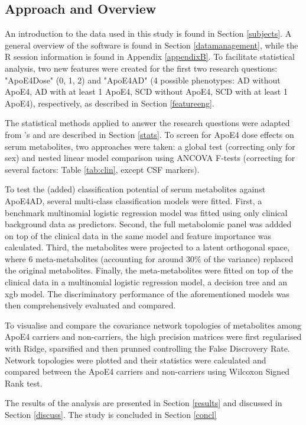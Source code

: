 \documentclass{amsart}
\begin{document}
\subsection{Approach and Overview}
An introduction to the data used in this study is found in Section \ref{subjects}. A general overview of the software is found in Section \ref{datamanagement}, while the R session information is found in Appendix \ref{appendixB}. To facilitate statistical analysis, two new features were created for the first two research questions: "ApoE4Dose" (0, 1, 2) and "ApoE4AD" (4 possible phenotypes: AD without ApoE4, AD with at least 1 ApoE4, SCD without ApoE4, SCD with at least 1 ApoE4), respectively, as described in Section \ref{featureeng}.

The statistical methods applied to answer the research questions were adapted from 's  and are described in Section \ref{stats}. To screen for ApoE4 dose effects on serum metabolites, two approaches were taken: a global test (correcting only for sex) and nested linear model comparison using ANCOVA F-tests (correcting for several factors: Table \ref{tab:clin}, except CSF markers). 

To test the (added) classification potential of serum metabolites against ApoE4AD, several multi-class classification models were fitted. First, a benchmark multinomial logistic regression model was fitted using only clinical background data as predictors. Second, the full metabolomic panel was addded on top of the clinical data in the same model and feature importance was calculated. Third, the metabolites were projected to a latent orthogonal space, where 6 meta-metabolites (accounting for around 30\% of the variance) replaced the original metabolites. Finally, the meta-metabolites were fitted on top of the clinical data in a multinomial logistic regression model, a decision tree and an \acrfull{xgb} model. The discriminatory performance of the aforementioned models was then comprehensively evaluated and compared.

To visualise and compare the covariance network topologies of metabolites among ApoE4 carriers and non-carriers, the high precision matrices were first regularised with Ridge, sparsified and then prunned controlling the False Discrovery Rate. Network topologies were plotted and their statistics were calculated and compared between the ApoE4 carriers and non-carriers using Wilcoxon Signed Rank test.

The results of the analysis are presented in Section \ref{results} and discussed in Section \ref{discuss}. The study is concluded in Section \ref{concl}
\end{document}
